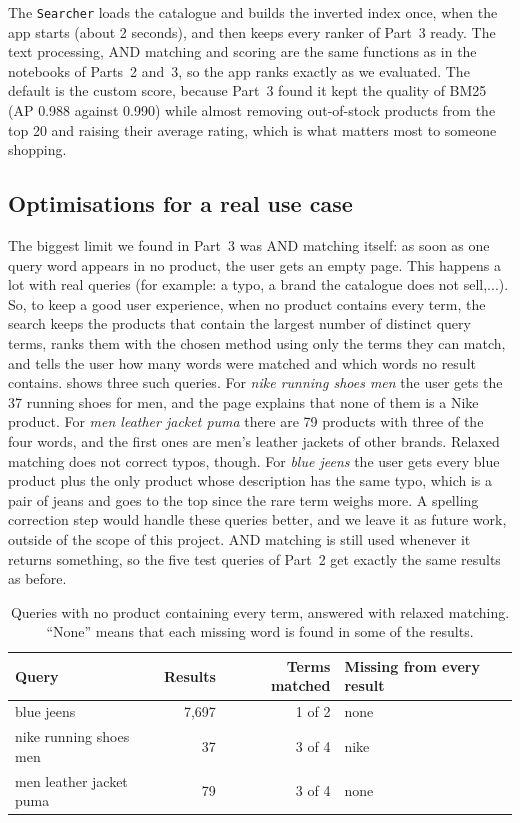 \documentclass[11pt,a4paper]{article}
\begin{document}
The \texttt{Searcher} loads the catalogue and builds the inverted index once, when the app starts (about 2 seconds), and then keeps every ranker of Part~3 ready. The text processing, AND matching and scoring are the same functions as in the notebooks of Parts~2 and~3, so the app ranks exactly as we evaluated. The default is the custom score, because Part~3 found it kept the quality of BM25 (AP 0.988 against 0.990) while almost removing out-of-stock products from the top 20 and raising their average rating, which is what matters most to someone shopping.

\subsection{Optimisations for a real use case}

The biggest limit we found in Part~3 was AND matching itself: as soon as one query word appears in no product, the user gets an empty page. This happens a lot with real queries (for example: a typo, a brand the catalogue does not sell,...). So, to keep a good user experience, when no product contains every term, the search keeps the products that contain the largest number of distinct query terms, ranks them with the chosen method using only the terms they can match, and tells the user how many words were matched and which words no result contains.  shows three such queries. For \emph{nike running shoes men} the user gets the 37 running shoes for men, and the page explains that none of them is a Nike product. For \emph{men leather jacket puma} there are 79 products with three of the four words, and the first ones are men's leather jackets of other brands. Relaxed matching does not correct typos, though. For \emph{blue jeens} the user gets every blue product plus the only product whose description has the same typo, which is a pair of jeans and goes to the top since the rare term weighs more. A spelling correction step would handle these queries better, and we leave it as future work, outside of the scope of this project. AND matching is still used whenever it returns something, so the five test queries of Part~2 get exactly the same results as before.

\begin{table}[ht]
  \centering
  \begin{tabular}{lrrl}
    \toprule
    Query & Results & Terms matched & Missing from every result \\
    \midrule
    blue jeens & 7,697 & 1 of 2 & none \\
    nike running shoes men & 37 & 3 of 4 & nike \\
    men leather jacket puma & 79 & 3 of 4 & none \\
    \bottomrule
  \end{tabular}
  \caption{Queries with no product containing every term, answered with relaxed matching. ``None'' means that each missing word is found in some of the results.}
  \label{tab:relaxed}
\end{table}
\end{document}
